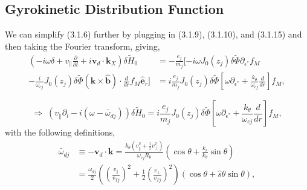 \documentclass[12pt]{article}
\numberwithin{equation}{subsection}
\begin{document}
\subsection{Gyrokinetic Distribution Function}
   \quad We can simplify (3.1.6) further by plugging in (3.1.9), (3.1.10), and (3.1.15) and then taking the Fourier transform, giving,
   \begin{equation}
   \begin{aligned}
      (-i\omega\delta + v_\parallel\frac{\partial}{\partial l} + i \bm{v}_d\cdot\bm{k}_X)\delta\widetilde{H}_0 &=
      -\frac{e_j}{m_j}[-i\omega J_0(z_j)\delta\widetilde{\Phi}\partial_{\epsilon^*}f_M \\
      -\frac{i}{\omega_{cj}}J_0(z_j)\delta\widetilde{\Phi}(\bm{k}\times\bm{\hat{b}})\cdot\frac{d}{dr} f_M\bm{\hat{e}}_r] &=
      i\frac{e_j}{m_j}J_0(z_j)\delta\widetilde{\Phi}[\omega\partial_{\epsilon^*} + \frac{k_\theta}{\omega_{cj}}\frac{d}{dr}]f_M,
   \end{aligned}
   \end{equation}

   \begin{equation}
      \Rightarrow\; (v_\parallel\partial_l - i(\omega - \bar{\omega}_{dj}))\delta\widetilde{H}_0 =
      i\frac{e_j}{m_j}J_0(z_j)\delta\widetilde{\Phi}[\omega\partial_{\epsilon^*} + \frac{k_\theta}{\omega_{cj}}\frac{d}{dr}]f_M,
   \end{equation}
with the following definitions,
   \begin{equation}
   \begin{aligned}
      \bar{\omega}_{dj} &\equiv -\bm{v}_d\cdot\bm{k} = \frac{k_\theta(v_\parallel^2 + \frac{1}{2}v_\perp^2)}{\omega_{cj}R_0}(\cos\theta
                                + \frac{k_r}{k_\theta}\sin\theta) \\
                        &= \frac{\omega_{dj}}{2}(\left(\frac{v_\parallel}{v_{Tj}}\right)^2 + \frac{1}{2}\left(\frac{v_\perp}{v_{Tj}}\right)^2)
                           (\cos\theta + \hat{s}\theta\sin\theta),  
   \end{aligned}
   \end{equation}
\end{document}
